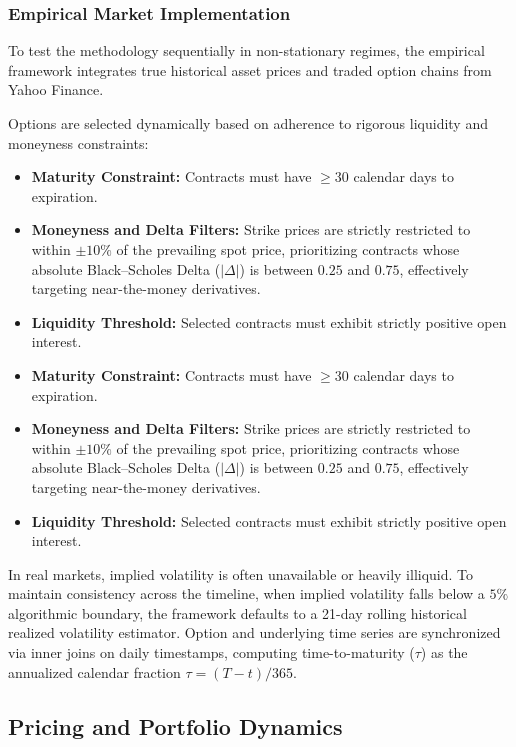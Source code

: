 \documentclass{article}
\begin{document}
\subsubsection{Empirical Market Implementation}
To test the methodology sequentially in non-stationary regimes, the empirical framework integrates true historical asset prices and traded option chains from Yahoo Finance.

Options are selected dynamically based on adherence to rigorous liquidity and moneyness constraints:
\begin{itemize}
    \item \textbf{Maturity Constraint:} Contracts must have $\geq 30$ calendar days to expiration.
    \item \textbf{Moneyness and Delta Filters:} Strike prices are strictly restricted to within $\pm 10\%$ of the prevailing spot price, prioritizing contracts whose absolute Black--Scholes Delta ($|\Delta|$) is between $0.25$ and $0.75$, effectively targeting near-the-money derivatives.
    \item \textbf{Liquidity Threshold:} Selected contracts must exhibit strictly positive open interest.
    \item \textbf{Maturity Constraint:} Contracts must have $\geq 30$ calendar days to expiration.
    \item \textbf{Moneyness and Delta Filters:} Strike prices are strictly restricted to within $\pm 10\%$ of the prevailing spot price, prioritizing contracts whose absolute Black--Scholes Delta ($|\Delta|$) is between $0.25$ and $0.75$, effectively targeting near-the-money derivatives.
    \item \textbf{Liquidity Threshold:} Selected contracts must exhibit strictly positive open interest.
\end{itemize}

In real markets, implied volatility is often unavailable or heavily illiquid. To maintain consistency across the timeline, when implied volatility falls below a $5\%$ algorithmic boundary, the framework defaults to a 21-day rolling historical realized volatility estimator. Option and underlying time series are synchronized via inner joins on daily timestamps, computing time-to-maturity ($\tau$) as the annualized calendar fraction $\tau = (T - t) / 365$.

\subsection{Pricing and Portfolio Dynamics}
\end{document}
